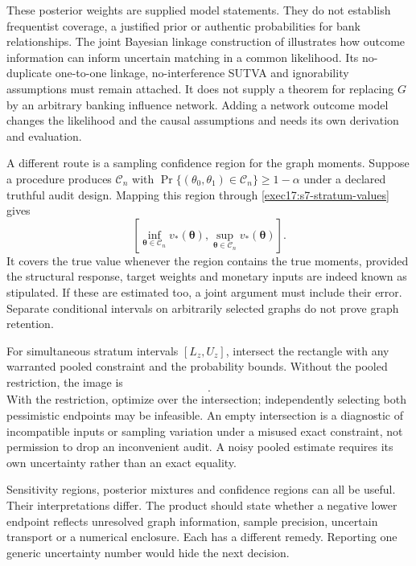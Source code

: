 These posterior weights are supplied model statements. They do not establish
frequentist coverage, a justified prior or authentic probabilities for bank
relationships. The joint Bayesian linkage construction of \citet{guha2022}
illustrates how outcome information can inform uncertain matching in a common
likelihood. Its no-duplicate one-to-one linkage, no-interference SUTVA and
ignorability assumptions must remain attached. It does not supply a theorem
for replacing $G$ by an arbitrary banking influence network. Adding a network
outcome model changes the likelihood and the causal assumptions and needs its
own derivation and evaluation.

A different route is a sampling confidence region for the graph moments.
Suppose a procedure produces $\mathcal C_n$ with
$\Pr\{(\theta_0,\theta_1)\in\mathcal C_n\}\geq1-\alpha$ under a declared
truthful audit design. Mapping this region through
\eqref{exec17:s7-stratum-values} gives
\begin{equation}
 \left[\inf_{\boldsymbol\theta\in\mathcal C_n}v_*(\boldsymbol\theta),
       \sup_{\boldsymbol\theta\in\mathcal C_n}v_*(\boldsymbol\theta)\right].
 \label{exec17:s7-region-image}
\end{equation}
It covers the true value whenever the region contains the true moments,
provided the structural response, target weights and monetary inputs are
indeed known as stipulated. If these are estimated too, a joint argument
must include their error. Separate conditional intervals on arbitrarily
selected graphs do not prove graph retention.

For simultaneous stratum intervals $[L_z,U_z]$, intersect the rectangle with
any warranted pooled constraint and the probability bounds. Without the
pooled restriction, the image is
\begin{equation}
 [22-8U_0-48U_1,\;22-8L_0-48L_1].
 \label{exec17:s7-rectangle}
\end{equation}
With the restriction, optimize over the intersection; independently selecting
both pessimistic endpoints may be infeasible. An empty intersection is a
diagnostic of incompatible inputs or sampling variation under a misused exact
constraint, not permission to drop an inconvenient audit. A noisy pooled
estimate requires its own uncertainty rather than an exact equality.

Sensitivity regions, posterior mixtures and confidence regions can all be
useful. Their interpretations differ. The product should state whether a
negative lower endpoint reflects unresolved graph information, sample
precision, uncertain transport or a numerical enclosure. Each has a different
remedy. Reporting one generic uncertainty number would hide the next decision.

